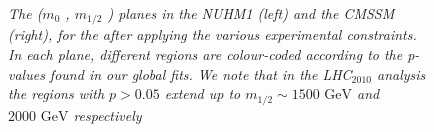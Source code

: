 \documentclass[cits]{PoS}
\newcommand{\gev}{\,\, \mathrm{GeV}}
\begin{document}
\begin{figure}[htb!]
    \vspace{-1cm}
    \caption{\it 
        The ($m_{0}$ , $m_{1/2}$ ) planes in the NUHM1 (left) and the CMSSM (right), for the
        after applying the various experimental constraints. In each plane, different regions are
        colour-coded according to the p-values found in our global fits. We note that
        in the LHC$_{2010}$ analysis the regions with $p > 0.05$ extend up to
        $m_{1/2} \sim 1500 \gev$ and $2000 \gev$ respectively
    }
    \label{fig:m0m12pval}
\end{figure}

\clearpage
\end{document}
